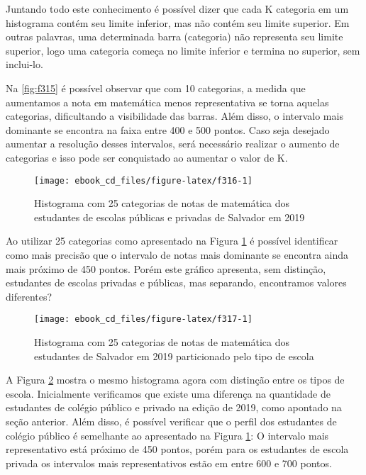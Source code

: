 \documentclass[
  oneside]{book}
\begin{document}
Juntando todo este conhecimento é possível dizer que cada K categoria em um histograma contém seu limite inferior, mas não contém seu limite superior. Em outras palavras, uma determinada barra (categoria) não representa seu limite superior, logo uma categoria começa no limite inferior e termina no superior, sem inclui-lo.

Na \ref{fig:f315} é possível observar que com 10 categorias, a medida que aumentamos a nota em matemática menos representativa se torna aquelas categorias, dificultando a visibilidade das barras. Além disso, o intervalo mais dominante se encontra na faixa entre 400 e 500 pontos. Caso seja desejado aumentar a resolução desses intervalos, será necessário realizar o aumento de categorias e isso pode ser conquistado ao aumentar o valor de K.

\begin{figure}

{\centering \texttt{[image: ebook\_cd\_files/figure-latex/f316-1]} 

}

\caption{Histograma com 25 categorias de notas de matemática dos estudantes de escolas públicas e privadas de Salvador em 2019}\label{fig:f316}
\end{figure}

Ao utilizar 25 categorias como apresentado na Figura \ref{fig:f316} é possível identificar como mais precisão que o intervalo de notas mais dominante se encontra ainda mais próximo de 450 pontos. Porém este gráfico apresenta, sem distinção, estudantes de escolas privadas e públicas, mas separando, encontramos valores diferentes?

\begin{figure}

{\centering \texttt{[image: ebook\_cd\_files/figure-latex/f317-1]} 

}

\caption{Histograma com 25 categorias de notas de matemática dos estudantes de Salvador em 2019 particionado pelo tipo de escola}\label{fig:f317}
\end{figure}

A Figura \ref{fig:f317} mostra o mesmo histograma agora com distinção entre os tipos de escola. Inicialmente verificamos que existe uma diferença na quantidade de estudantes de colégio público e privado na edição de 2019, como apontado na seção anterior. Além disso, é possível verificar que o perfil dos estudantes de colégio público é semelhante ao apresentado na Figura \ref{fig:f316}: O intervalo mais representativo está próximo de 450 pontos, porém para os estudantes de escola privada os intervalos mais representativos estão em entre 600 e 700 pontos.
\end{document}
